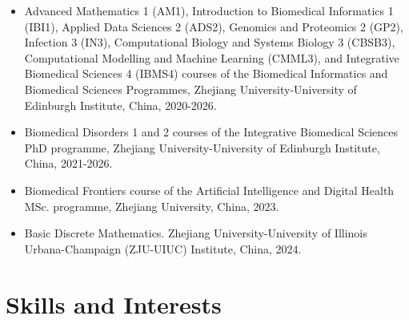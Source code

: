 \documentclass[11pt,a4paper,sans]{moderncv} %
\begin{document}
\begin{itemize}
  \item Advanced Mathematics 1 (AM1), Introduction to Biomedical Informatics 1 (IBI1), Applied Data Sciences 2 (ADS2), Genomics and Proteomics 2 (GP2), Infection 3 (IN3), Computational Biology and Systems Biology 3 (CBSB3), Computational Modelling and Machine Learning (CMML3), and Integrative Biomedical Sciences 4 (IBMS4) courses of the Biomedical Informatics and Biomedical Sciences Programmes, Zhejiang University-University of Edinburgh Institute, China, 2020-2026.
  \item Biomedical Disorders 1 and 2 courses of the Integrative Biomedical Sciences PhD programme, Zhejiang University-University of Edinburgh Institute, China, 2021-2026.
  \item Biomedical Frontiers course of the Artificial Intelligence and Digital Health MSc. programme, Zhejiang University, China, 2023.
  \item Basic Discrete Mathematics. Zhejiang University-University of Illinois Urbana-Champaign (ZJU-UIUC) Institute, China, 2024.
\end{itemize}



\vspace{0.1cm}

\section{Skills and Interests}
\end{document}
